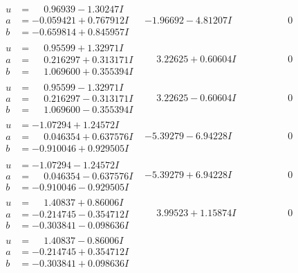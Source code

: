 \documentclass[1p]{elsarticle_modified}
\theoremstyle{definition}
\begin{document}
$$\begin{array}{c|c|c}
\begin{aligned}
u &= \phantom{-}0.96939 - 1.30247 I \\
a &= -0.059421 + 0.767912 I \\
b &= -0.659814 + 0.845957 I\end{aligned}
 & -1.96692 - 4.81207 I & \phantom{-0.000000 } 0 \\ \hline\begin{aligned}
u &= \phantom{-}0.95599 + 1.32971 I \\
a &= \phantom{-}0.216297 + 0.313171 I \\
b &= \phantom{-}1.069600 + 0.355394 I\end{aligned}
 & \phantom{-}3.22625 + 0.60604 I & \phantom{-0.000000 } 0 \\ \hline\begin{aligned}
u &= \phantom{-}0.95599 - 1.32971 I \\
a &= \phantom{-}0.216297 - 0.313171 I \\
b &= \phantom{-}1.069600 - 0.355394 I\end{aligned}
 & \phantom{-}3.22625 - 0.60604 I & \phantom{-0.000000 } 0 \\ \hline\begin{aligned}
u &= -1.07294 + 1.24572 I \\
a &= \phantom{-}0.046354 + 0.637576 I \\
b &= -0.910046 + 0.929505 I\end{aligned}
 & -5.39279 - 6.94228 I & \phantom{-0.000000 } 0 \\ \hline\begin{aligned}
u &= -1.07294 - 1.24572 I \\
a &= \phantom{-}0.046354 - 0.637576 I \\
b &= -0.910046 - 0.929505 I\end{aligned}
 & -5.39279 + 6.94228 I & \phantom{-0.000000 } 0 \\ \hline\begin{aligned}
u &= \phantom{-}1.40837 + 0.86006 I \\
a &= -0.214745 - 0.354712 I \\
b &= -0.303841 - 0.098636 I\end{aligned}
 & \phantom{-}3.99523 + 1.15874 I & \phantom{-0.000000 } 0 \\ \hline\begin{aligned}
u &= \phantom{-}1.40837 - 0.86006 I \\
a &= -0.214745 + 0.354712 I \\
b &= -0.303841 + 0.098636 I\end{aligned}

\end{array}$$
\end{document}
